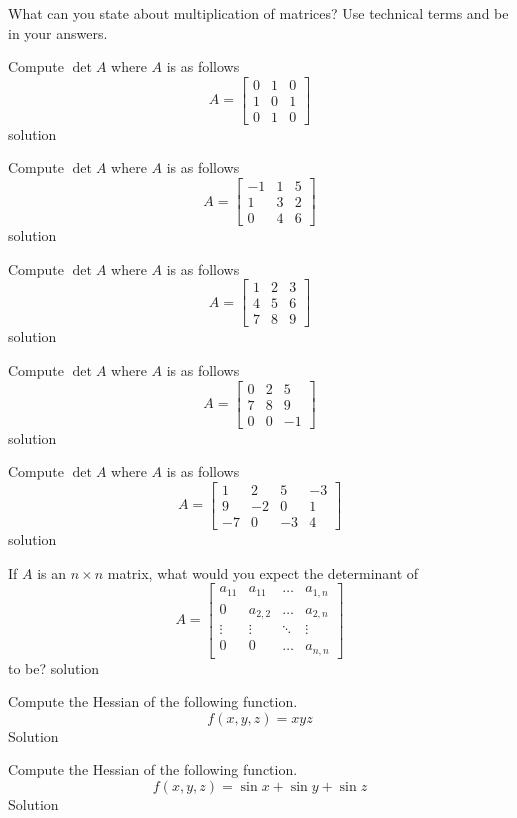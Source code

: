 \documentclass{amsart}
\begin{document}
{
What can you state about multiplication of matrices? Use technical terms and be  in your answers.

{
Compute $\det A$ where $A$ is as follows
\[A=
\begin{bmatrix}
	0 & 1 & 0 \\
	1 & 0 & 1 \\
	0 & 1 & 0
\end{bmatrix}
\]
}
{
solution
}

{
Compute $\det A$ where $A$ is as follows
\[A=
\begin{bmatrix}
	-1 & 1 & 5 \\
	1 & 3 & 2 \\
	0 & 4 & 6
\end{bmatrix}
\]
}
{
solution
}

{
Compute $\det A$ where $A$ is as follows
\[A=
\begin{bmatrix}
	1 & 2 & 3 \\
	4 & 5 & 6 \\
	7 & 8 & 9
\end{bmatrix}
\]
}
{
solution
}

{
Compute $\det A$ where $A$ is as follows
\[A=
\begin{bmatrix}
	0 & 2 & 5 \\
	7 & 8 & 9 \\
	0 & 0 & -1
\end{bmatrix}
\]
}
{
solution
}

{
Compute $\det A$ where $A$ is as follows
\[A=
\begin{bmatrix}
	1 & 2 & 5 & -3 \\
	9 & -2 & 0 & 1 \\
	-7 & 0 & -3 & 4
\end{bmatrix}
\]
}
{
solution
}



{
If $A$ is an $n\times n$ matrix, what would you expect the determinant of 
\[A =
\begin{bmatrix}
	a_{11} & 	a_{11} & \dots & a_{1, n} \\
0	& a_{2,2} & \dots & a_{2,n} \\
\vdots & \vdots  &\ddots & \vdots \\
0 & 0 & \dots &a_{n,n}
\end{bmatrix}
	\]
to be?
}
{
solution
}

{
Compute the Hessian of the following function.
\[f(x,y,z) = xyz\]
}
{
Solution
}

{
Compute the Hessian of the following function.
\[f(x,y,z) = \sin x + \sin y +\sin z\]
}
{
Solution
}

}
\end{document}

